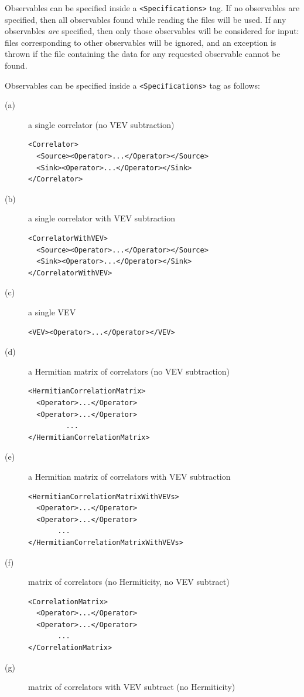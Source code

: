\documentclass[12pt]{article}
\newcommand{\vb}{\texttt}
\begin{document}
Observables can be specified inside a \vb{<Specifications>} tag.  If no
observables are specified, then all observables found while reading the
files will be used.  If any observables \textit{are} specified, then only
those observables will be considered for input: files corresponding to other
observables will be ignored, and an exception is thrown if the file
containing the data for any requested observable cannot be found.

Observables can be specified inside a \vb{<Specifications>} tag as follows:
\begin{description}
\item[(a)]
  a single correlator (no VEV subtraction)
\begin{verbatim}
<Correlator>
  <Source><Operator>...</Operator></Source>
  <Sink><Operator>...</Operator></Sink>
</Correlator>
\end{verbatim}
\item[(b)]
  a single correlator with VEV subtraction
\begin{verbatim}
<CorrelatorWithVEV>
  <Source><Operator>...</Operator></Source>
  <Sink><Operator>...</Operator></Sink>
</CorrelatorWithVEV>
\end{verbatim}
\item[(c)]
  a single VEV
\begin{verbatim}
<VEV><Operator>...</Operator></VEV>
\end{verbatim}
\item[(d)]
  a Hermitian matrix of correlators (no VEV subtraction)
\begin{verbatim}
<HermitianCorrelationMatrix>
  <Operator>...</Operator>
  <Operator>...</Operator>
         ...
</HermitianCorrelationMatrix>
\end{verbatim}
\item[(e)]
  a Hermitian matrix of correlators with VEV subtraction
\begin{verbatim}
<HermitianCorrelationMatrixWithVEVs>
  <Operator>...</Operator>
  <Operator>...</Operator>
       ...
</HermitianCorrelationMatrixWithVEVs>
\end{verbatim}
\item[(f)]
  matrix of correlators (no Hermiticity, no VEV subtract)
\begin{verbatim}
<CorrelationMatrix>
  <Operator>...</Operator>
  <Operator>...</Operator>
       ...
</CorrelationMatrix>
\end{verbatim}
\item[(g)]
  matrix of correlators with VEV subtract (no Hermiticity)

\end{description}
\end{document}
